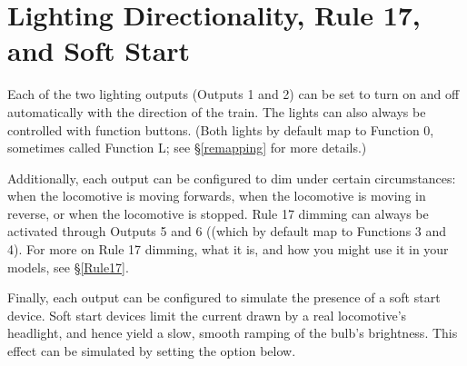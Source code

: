 \documentclass[12pt,letterpaper,draft]{memoir} %
\begin{document}
\section{Lighting Directionality, Rule 17, and Soft Start}

Each of the two lighting outputs (Outputs 1 and 2) can be set to turn on and off automatically with the direction of the train. The lights can also always be controlled with function buttons. (Both lights by default map to Function 0, sometimes called Function L; see \S\ref{remapping} for more details.)

\label{configRule17}Additionally, each output can be configured to dim under certain circumstances: when the locomotive is moving forwards, when the locomotive is moving in reverse, or when the locomotive is stopped. Rule 17 dimming can always be activated through Outputs 5 and 6 ((which by default map to Functions 3 and 4). For more on Rule 17 dimming, what it is, and how you might use it in your models, see \S\ref{Rule17}.

\label{configSoftStart}Finally, each output can be configured to simulate the presence of a soft start device. Soft start devices limit the current drawn by a real locomotive's headlight, and hence yield a slow, smooth ramping of the bulb's brightness. This effect can be simulated by setting the option below.
\end{document}
